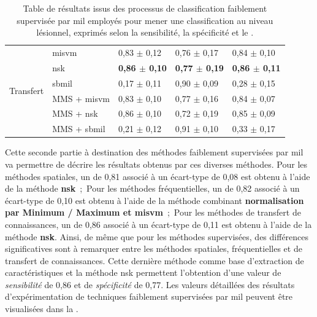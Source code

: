 \begin{table}[H]
\begin{tabular}{cllll}
        \multirow{6}{*}{Transfert}   & \gls{misvm}          & 0,83 $\pm$ 0,12             & 0,76 $\pm$ 0,17             & 0,84 $\pm$ 0,10             \\
                                     & \gls{nsk}            & \textbf{0,86 $\pm$ 0,10}    & \textbf{0,77 $\pm$ 0,19}    & \textbf{0,86 $\pm$ 0,11}    \\
                                     & \gls{sbmil}          & 0,17 $\pm$ 0,11             & 0,90 $\pm$ 0,09             & 0,28 $\pm$ 0,15             \\
                                     & MMS + \gls{misvm}    & 0,83 $\pm$ 0,10             & 0,77 $\pm$ 0,16             & 0,84 $\pm$ 0,07             \\
                                     & MMS + \gls{nsk}      & 0,86 $\pm$ 0,10             & 0,72 $\pm$ 0,19             & 0,85 $\pm$ 0,09             \\
                                     & MMS + \gls{sbmil}    & 0,21 $\pm$ 0,12             & 0,91 $\pm$ 0,10             & 0,33 $\pm$ 0,17             \\ \bottomrule
    \end{tabular}
    \caption{Table de résultats issus des processus de classification faiblement supervisée par \gls{mil} employés pour mener une classification au niveau lésionnel, exprimés selon la sensibilité, la spécificité et le \fscore{}.}
    \label{tab:results_lesion_classification_weakly_patient}
\end{table}
\clearpage

Cette seconde partie à destination des méthodes faiblement supervisées par \gls{mil} va permettre de décrire les résultats obtenus par ces diverses méthodes. Pour les méthodes spatiales, un \fscore{} de 0,81 associé à un écart-type de 0,08 est obtenu à l'aide de la méthode \textbf{\gls{nsk}}~;~Pour les méthodes fréquentielles, un \fscore{} de 0,82 associé à un écart-type de 0,10 est obtenu à l'aide de la méthode combinant \textbf{normalisation par Minimum / Maximum et \gls{misvm}}~;~Pour les méthodes de transfert de connaissances, un \fscore{} de 0,86 associé à un écart-type de 0,11 est obtenu à l'aide de la méthode \textbf{\gls{nsk}}. Ainsi, de même que pour les méthodes supervisées, des différences significatives sont à remarquer entre les méthodes spatiales, fréquentielles et de transfert de connaissances. Cette dernière méthode comme base d'extraction de caractéristiques et la méthode \gls{nsk} permettent l'obtention d'une valeur de \textit{sensibilité} de 0,86 et de \textit{spécificité} de 0,77. Les valeurs détaillées des résultats d'expérimentation de techniques faiblement supervisées par \gls{mil} peuvent être visualisées dans la .\par

